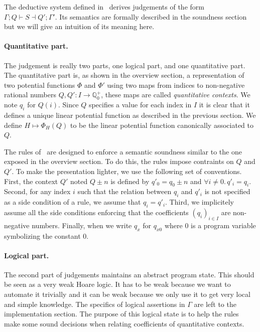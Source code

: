 \documentclass[nocopyrightspace,preprint]{sigplanconf}
\newcommand{\pref}[1]{\prettyref{#1}}
\begin{document}
The deductive system defined in~\pref{fig:proof} derives
judgements of the form $\Gamma; Q \vdash S \dashv Q'; \Gamma'$.
Its semantics are formally described in the soundness section but we
will give an intuition of its meaning here.

\paragraph{Quantitative part.}
The judgement is really two parts, one logical part, and one quantitative
part.  The quantitative part is, as shown in the overview section, a
representation of two potential functions $\Phi$ and $\Phi'$ using
two maps from indices to non-negative rational numbers
$Q, Q' : I \rightarrow \mathbb Q_0^+$, these maps are called
\emph{quantitative contexts}.
We note $q_i$ for $Q(i)$.  Since $Q$ specifies a value for each
index in $I$ it is clear that it defines a unique linear potential function
as described in the previous section. We define $H \mapsto \Phi_H(Q)$
to be the linear potential function canonically associated to $Q$.

The rules of~\pref{fig:proof} are designed to enforce a semantic
soundness similar to the one exposed in the overview section.  To
do this, the rules impose contraints on $Q$ and $Q'$.  To make the
presentation lighter, we use the following  set of conventions.
First, the context $Q'$ noted $Q \pm n$ is defined by $q'_0 = q_0 \pm n$
and $\forall i \neq 0.\, q'_i = q_i$.  Second, for any index $i$ such that
the relation between $q_i$ and $q'_i$ is not specified as a side condition
of a rule, we assume that $q_i = q'_i$.  Third, we implicitely assume
all the side conditions enforcing that the coefficients $(q_i)_{i \in I}$ are
non-negative numbers. Finally, when we write $q_x$ for $q_{x0}$ where
0 is a program variable symbolizing the constant 0.

\paragraph{Logical part.}
The second part of judgements maintains an abstract program state.
This should be seen as a very weak Hoare logic.  It has to be weak because
we want to automate it trivially and it can be weak because we only use
it to get very local and simple knowledge.  The specifics of logical assertions
in $\Gamma$ are left to the implementation section.
%
The purpose of this logical state is to help the rules
make some sound decisions when relating coefficients of quantitative
contexts.
\end{document}
